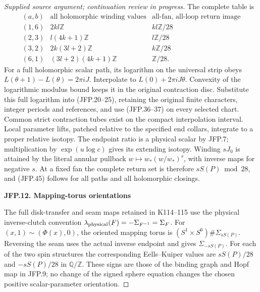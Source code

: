 \begin{proof}[Supplied source argument; continuation review in progress]
The complete table is
\[
\begin{array}{c|c|c}
(a,b)&\text{all holomorphic winding values}&
\text{all-fan, all-loop return image}\\\hline
(1,6)&2kl\mathbb Z&kl\mathbb Z/28\\
(2,3)&l(4k+1)\mathbb Z&l\mathbb Z/28\\
(3,2)&2k(3l+2)\mathbb Z&k\mathbb Z/28\\
(6,1)&(3l+2)(4k+1)\mathbb Z&\mathbb Z/28.
\end{array}
\tag{JFP.45}
\]
For a full holomorphic scalar path, its logarithm on the
universal strip obeys \(L(\theta+1)-L(\theta)=2\pi iJ\).
Interpolate to \(L(0)+2\pi iJ\theta\). Convexity of the
logarithmic modulus bound keeps it in the original contraction
disc. Substitute this full logarithm into (JFP.20--25), retaining
the original finite characters, integer periods and references,
and use (JFP.36--37) on every selected chart. Common strict
contraction tubes exist on the compact interpolation interval.
Local parameter lifts, patched relative to the specified end
collars, integrate to a proper relative isotopy. The endpoint
ratio is a physical scalar by JFP.7; multiplication by
\(\exp(u\log c)\) gives its extending isotopy. Winding
\(sJ_0\) is attained by the literal annular pullback
\(w\mapsto w_*(w/w_*)^s\), with inverse maps for negative
\(s\). At a fixed fan the complete return set is therefore
\(sS(P)\bmod28\), and (JFP.45) follows for all paths and
all holomorphic closings.

\par

\medskip\noindent\textbf{JFP.12. Mapping-torus orientations}

\par\nobreak

The full disk-transfer and seam maps retained in K114--115 use
the physical inverse-clutch convention
\(\lambda_{\rm physical}(F)=-\Sigma_{F^{-1}}=\Sigma_F\).
For \((x,1)\sim(\Phi(x),0)\), the oriented mapping torus
is \((S^1\times S^6)\#\Sigma_{sS(P)}\). Reversing the
seam uses the actual inverse endpoint and gives
\(\Sigma_{-sS(P)}\). For each of the two spin structures
the corresponding Eells--Kuiper values are
\(sS(P)/28\) and \(-sS(P)/28\) in \(\mathbb Q/\mathbb Z\).
These signs are those of the binding graph and Hopf map in
JFP.9; no change of the signed sphere equation changes the
chosen positive scalar-parameter orientation.


\end{proof}
